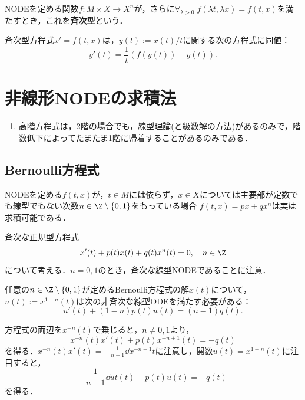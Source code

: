 \documentclass[uplatex,dvipdfmx]{jsreport}
\begin{document}
\begin{definition}
    NODEを定める関数$f:M\times X\to X^n$が，さらに$\forall_{\lambda>0}\;f(\lambda t,\lambda x)=f(t,x)$を満たすとき，これを\textbf{斉次型}という．
\end{definition}

\begin{proposition}
    斉次型方程式$x'=f(t,x)$は，$y(t):=x(t)/t$に関する次の方程式に同値：
    \[y'(t)=\frac{1}{t}(f(y(t))-y(t)).\]
\end{proposition}

\section{非線形NODEの求積法}

\begin{tcolorbox}[colframe=ForestGreen, colback=ForestGreen!10!white,breakable,colbacktitle=ForestGreen!40!white,coltitle=black,fonttitle=\bfseries\sffamily,
title=]
    \begin{enumerate}
        \item 高階方程式は，2階の場合でも，線型理論(と級数解の方法)があるのみで，階数低下によってたまたま1階に帰着することがあるのみである．
    \end{enumerate}
\end{tcolorbox}

\subsection{Bernoulli方程式}

\begin{tcolorbox}[colframe=ForestGreen, colback=ForestGreen!10!white,breakable,colbacktitle=ForestGreen!40!white,coltitle=black,fonttitle=\bfseries\sffamily,
title=]
    NODEを定める$f(t,x)$が，$t\in M$には依らず，$x\in X$については主要部が定数でも線型でもない次数$n\in\Z\setminus\{0,1\}$をもっている場合
    $f(t,x)=px+qx^n$は実は求積可能である．
\end{tcolorbox}

\begin{problem}\label{prob-Bernoulli-type-NODE}
    斉次な正規型方程式
    \[x'(t)+p(t)x(t)+q(t)x^n(t)=0,\quad n\in\Z\]
    について考える．$n=0,1$のとき，斉次な線型NODEであることに注意．
\end{problem}

\begin{proposition}
    任意の$n\in\Z\setminus\{0,1\}$が定めるBernoulli方程式の解$x(t)$について，$u(t):=x^{1-n}(t)$は次の非斉次な線型ODEを満たす必要がある：
    \[u'(t)+(1-n)p(t)u(t)=(n-1)q(t).\]
\end{proposition}
\begin{Proof}
    方程式の両辺を$x^{-n}(t)$で乗じると，$n\ne0,1$より，
    \[x^{-n}(t)x'(t)+p(t)x^{-n+1}(t)=-q(t)\]
    を得る．$x^{-n}(t)x'(t)=-\frac{1}{n-1}\dd{x^{-n+1}}{t}$に注意し，関数$u(t)=x^{1-n}(t)$に注目すると，
    \[-\frac{1}{n-1}\dd{u}{t}(t)+p(t)u(t)=-q(t)\]
    を得る．
\end{Proof}
\end{document}
